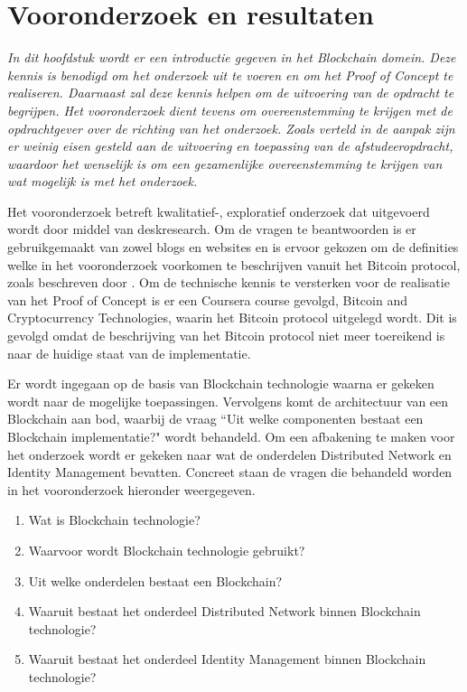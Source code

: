 \chapter{Vooronderzoek en resultaten}

\textit{In dit hoofdstuk wordt er een introductie gegeven in het Blockchain domein. Deze kennis is benodigd om het onderzoek uit te voeren en om het Proof of Concept te realiseren. Daarnaast zal deze kennis helpen om de uitvoering van de opdracht te begrijpen. Het vooronderzoek dient tevens om overeenstemming te krijgen met de opdrachtgever over de richting van het onderzoek. Zoals verteld in de aanpak zijn er weinig eisen gesteld aan de uitvoering en toepassing van de afstudeeropdracht, waardoor het wenselijk is om een gezamenlijke overeenstemming te krijgen van wat mogelijk is met het onderzoek.}

Het vooronderzoek betreft kwalitatief-, exploratief onderzoek dat uitgevoerd wordt door middel van deskresearch. Om de vragen te beantwoorden is er gebruikgemaakt van zowel blogs en websites en is ervoor gekozen om de definities welke in het vooronderzoek voorkomen te beschrijven vanuit het Bitcoin protocol, zoals beschreven door \cite{nakamoto2008bitcoin}. Om de technische kennis te versterken voor de realisatie van het Proof of Concept is er een Coursera course gevolgd, Bitcoin and Cryptocurrency Technologies, waarin het Bitcoin protocol uitgelegd wordt. Dit is gevolgd omdat de beschrijving van het Bitcoin protocol niet meer toereikend is naar de huidige staat van de implementatie.

Er wordt ingegaan op de basis van Blockchain technologie waarna er gekeken wordt naar de mogelijke toepassingen. Vervolgens komt de architectuur van een Blockchain aan bod, waarbij de vraag ``Uit welke componenten bestaat een Blockchain implementatie?" wordt behandeld. Om een afbakening te maken voor het onderzoek wordt er gekeken naar wat de onderdelen Distributed Network en Identity Management bevatten. Concreet staan de vragen die behandeld worden in het vooronderzoek hieronder weergegeven.

\begin{enumerate}[noitemsep]
  \item Wat is Blockchain technologie?
  \item Waarvoor wordt Blockchain technologie gebruikt?
  \item Uit welke onderdelen bestaat een Blockchain?
  \item Waaruit bestaat het onderdeel Distributed Network binnen Blockchain technologie?
  \item Waaruit bestaat het onderdeel Identity Management binnen Blockchain technologie?
\end{enumerate}

\newpage


\newpage


\newpage


\newpage


\newpage


\newpage


